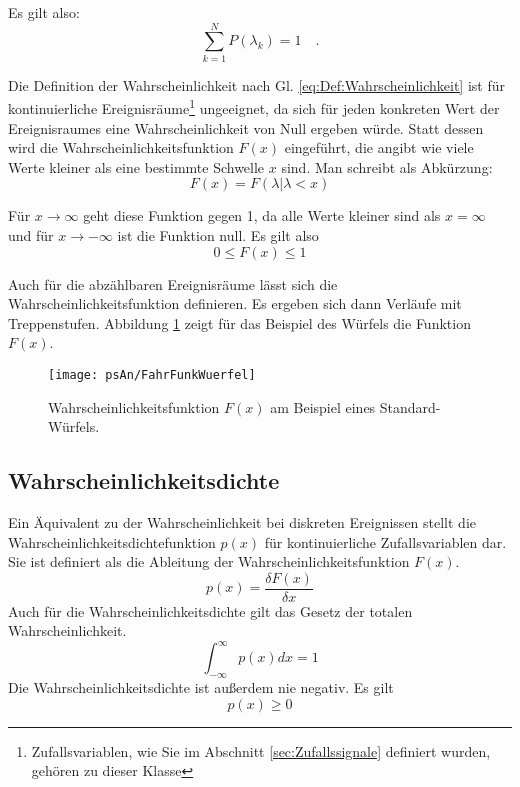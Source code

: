 Es gilt also:
\begin{equation}\label{eq:TotaleWahrscheinlichkeit}
    \sum_{k = 1}^{N} P(\lambda_k) = 1 \quad .
\end{equation}

Die Definition der Wahrscheinlichkeit nach Gl.
\ref{eq:Def:Wahrscheinlichkeit} ist für kontinuierliche
Ereignisräume\footnote{Zufallsvariablen, wie Sie im Abschnitt
\ref{sec:Zufallssignale} definiert wurden, gehören zu dieser
Klasse} ungeeignet, da sich für jeden konkreten Wert der
Ereignisraumes eine Wahrscheinlichkeit von Null ergeben würde.
Statt dessen wird die Wahrscheinlichkeitsfunktion $F(x)$
eingeführt, die angibt wie viele Werte kleiner als eine bestimmte
Schwelle $x$ sind. Man schreibt als Abkürzung:
\begin{equation}\label{eq:Def:Wahrscheinlichkeitsfunktion}
    F(x) = F(\lambda|\lambda<x)
\end{equation}

Für $x\rightarrow \infty$ geht diese Funktion gegen 1, da alle
Werte kleiner sind als $x = \infty$ und für $x \rightarrow
-\infty$ ist die Funktion null. Es gilt also
\begin{equation}\label{eq:WerteBereichWahrFkt}
    0 \leq F(x)\leq 1
\end{equation}

Auch für die abzählbaren Ereignisräume lässt sich die
Wahrscheinlichkeitsfunktion definieren. Es ergeben sich dann
Verläufe mit Treppenstufen. Abbildung \ref{pic:VerlaufWuerfel}
zeigt für das Beispiel des Würfels die Funktion $F(x)$.
\begin{figure}[H]
\begin{center}
\texttt{[image: psAn/FahrFunkWuerfel]}
\caption{\label{pic:VerlaufWuerfel}Wahrscheinlichkeitsfunktion
$F(x)$ am Beispiel eines Standard-Würfels.}
\end{center}
\end{figure}

\subsection{Wahrscheinlichkeitsdichte\label{sec:Wahrdichte}}
Ein Äquivalent zu der Wahrscheinlichkeit bei diskreten Ereignissen
stellt die Wahrscheinlichkeitsdichtefunktion $p(x)$ für
kontinuierliche Zufallsvariablen dar. Sie ist definiert als die
Ableitung der Wahrscheinlichkeitsfunktion $F(x)$.
\begin{equation}\label{eq:Def:Wahrscheinlichkeitsdichte}
    p(x) = \frac{\delta F(x)}{\delta x}
\end{equation}
Auch für die Wahrscheinlichkeitsdichte gilt das Gesetz der totalen
Wahrscheinlichkeit.
\begin{equation}\label{eq:Def:TotaleWahrscheinlichkeit}
    \int_{-\infty}^{\infty} p(x) dx = 1
\end{equation}
Die Wahrscheinlichkeitsdichte ist außerdem nie negativ. Es gilt
\begin{equation}\label{eq:Def:Positiv}
    p(x) \geq 0
\end{equation}

